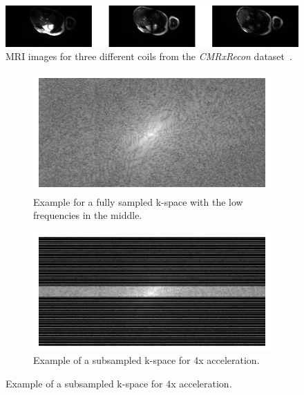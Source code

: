 \documentclass[english,version-2022-01]{uzl-thesis} %
\begin{document}
\begin{figure}[h]%
	\centering
	\graphicspath{{images/}{\main/images/}}
	\includegraphics[width=\linewidth]{CoilsHorizontal.png} 
	\caption{MRI images for three different coils from the \emph{CMRxRecon} dataset~\cite{CMRxRecon}.}
	\label{fig:Coils}
\end{figure}


\begin{figure}[h]%
	\centering
	\graphicspath{{images/}{\main/images/}}
	\begin{subfigure}{0.45\textwidth}
    		\includegraphics[width=\textwidth]{k-space_fullysampled.png}
    		\caption{Example for a fully sampled k-space with the low frequencies in the middle.}
    		\label{fig:fullySampled}
	\end{subfigure}
	\hfill
	\begin{subfigure}{0.45\textwidth}
    		\includegraphics[width=\textwidth]{k-space_subsampled.png}
    		\caption{Example of a subsampled k-space for 4x acceleration.}
    		\label{fig:subSampled}

\end{subfigure}
\end{figure}
\end{document}
